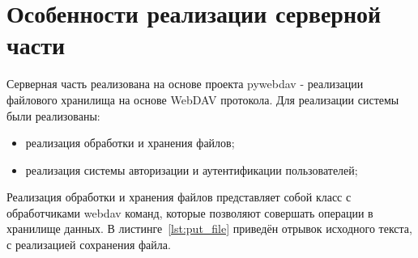 \documentclass[utf8,usehyperref,12pt]{G7-32}
\begin{document}
\section{Особенности реализации серверной части}

Серверная часть реализована на основе проекта pywebdav - реализации файлового хранилища на основе WebDAV протокола. Для реализации системы были реализованы: 
\begin{itemize}
 \item реализация обработки и хранения файлов;
 \item реализация системы авторизации и аутентификации пользователей;
\end{itemize}

Реализация обработки и хранения файлов представляет собой класс с обработчиками webdav команд, которые позволяют совершать операции в хранилище данных. В листинге~\ref{lst:put_file} приведён отрывок исходного текста, с реализацией сохранения файла.
\end{document}
